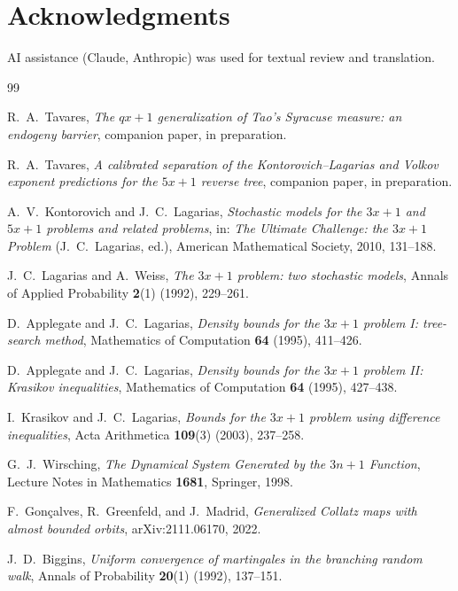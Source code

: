 \documentclass[11pt]{article}
\theoremstyle{remark}
\begin{document}
\section*{Acknowledgments}

AI assistance (Claude, Anthropic) was used for textual review and
translation.

\begin{thebibliography}{99}

 R.\ A.\ Tavares, \emph{The $qx+1$
  generalization of Tao's Syracuse measure: an endogeny barrier},
  companion paper, in preparation.

 R.\ A.\ Tavares, \emph{A calibrated
  separation of the Kontorovich--Lagarias and Volkov exponent
  predictions for the $5x+1$ reverse tree}, companion paper, in
  preparation.

 A.\ V.\ Kontorovich and J.\ C.\
  Lagarias, \emph{Stochastic models for the $3x+1$ and $5x+1$
  problems and related problems}, in: \emph{The Ultimate Challenge:
  the $3x+1$ Problem} (J.\ C.\ Lagarias, ed.), American Mathematical
  Society, 2010, 131--188.

 J.\ C.\ Lagarias and A.\ Weiss, \emph{The
  $3x+1$ problem: two stochastic models}, Annals of Applied
  Probability \textbf{2}(1) (1992), 229--261.

 D.\ Applegate and J.\ C.\ Lagarias,
  \emph{Density bounds for the $3x+1$ problem I: tree-search method},
  Mathematics of Computation \textbf{64} (1995), 411--426.

 D.\ Applegate and J.\ C.\ Lagarias,
  \emph{Density bounds for the $3x+1$ problem II: Krasikov
  inequalities}, Mathematics of Computation \textbf{64} (1995),
  427--438.

 I.\ Krasikov and J.\ C.\ Lagarias,
  \emph{Bounds for the $3x+1$ problem using difference inequalities},
  Acta Arithmetica \textbf{109}(3) (2003), 237--258.

 G.\ J.\ Wirsching, \emph{The Dynamical System
  Generated by the $3n+1$ Function}, Lecture Notes in Mathematics
  \textbf{1681}, Springer, 1998.

 F.\ Gon\c{c}alves, R.\
  Greenfeld, and J.\ Madrid, \emph{Generalized Collatz maps with almost
  bounded orbits}, arXiv:2111.06170, 2022.

 J.\ D.\ Biggins, \emph{Uniform convergence of
  martingales in the branching random walk}, Annals of Probability
  \textbf{20}(1) (1992), 137--151.


\end{thebibliography}
\end{document}
